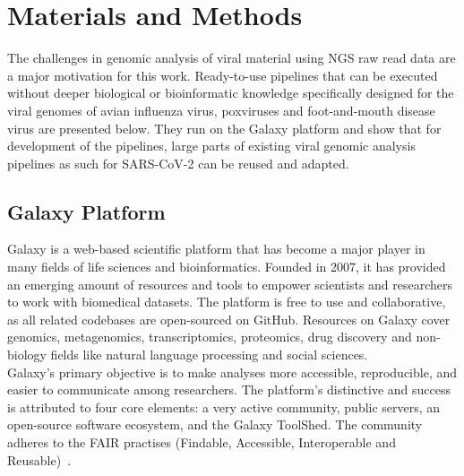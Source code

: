 \chapter{Materials and Methods}\label{chap:methods}
The challenges in genomic analysis of viral material using \ac{NGS} raw read data are a major motivation for this work. Ready-to-use pipelines that can be executed without deeper biological or bioinformatic knowledge specifically designed for the viral genomes of avian influenza virus, poxviruses and foot-and-mouth disease virus are presented below. They run on the Galaxy platform and show that for development of the pipelines, large parts of existing viral genomic analysis pipelines as such for SARS-CoV-2 can be reused and adapted.

\section{Galaxy Platform}\label{sec:galaxy}
Galaxy is a web-based scientific platform that has become a major player in many fields of life sciences and bioinformatics. Founded in 2007, it has provided an emerging amount of resources and tools to empower scientists and researchers to work with biomedical datasets. The platform is free to use and collaborative, as all related codebases are open-sourced on GitHub. Resources on Galaxy cover genomics, metagenomics, transcriptomics, proteomics, drug discovery and non-biology fields like natural language processing and social sciences.\\
Galaxy's primary objective is to make analyses more accessible, reproducible, and easier to communicate among researchers. The platform's distinctive and success is attributed to four core elements: a very active community, public servers, an open-source software ecosystem, and the Galaxy ToolShed. The community adheres to the FAIR practises (Findable, Accessible, Interoperable and Reusable)~\cite{10.1093/nar/gkac247}.

